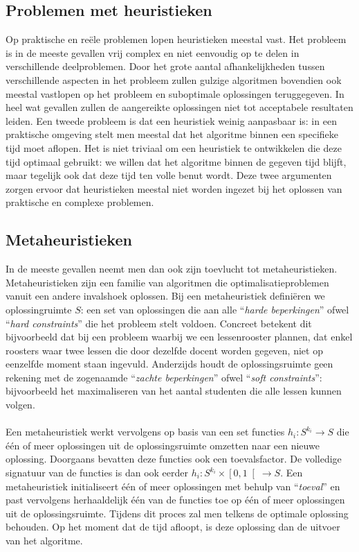 \subsection{Problemen met heuristieken}

Op praktische en re\"ele problemen lopen heuristieken meestal vast. Het probleem is in de meeste gevallen vrij complex en niet eenvoudig op te delen in verschillende deelproblemen. Door het grote aantal afhankelijkheden tussen verschillende aspecten in het probleem zullen gulzige algoritmen bovendien ook meestal vastlopen op het probleem en suboptimale oplossingen teruggegeven. In heel wat gevallen zullen de aangereikte oplossingen niet tot acceptabele resultaten leiden. Een tweede probleem is dat een heuristiek weinig aanpasbaar is: in een praktische omgeving stelt men meestal dat het algoritme binnen een specifieke tijd moet aflopen. Het is niet triviaal om een heuristiek te ontwikkelen die deze tijd optimaal gebruikt: we willen dat het algoritme binnen de gegeven tijd blijft, maar tegelijk ook dat deze tijd ten volle benut wordt. Deze twee argumenten zorgen ervoor dat heuristieken meestal niet worden ingezet bij het oplossen van praktische en complexe problemen.

\subsection{Metaheuristieken}

In de meeste gevallen neemt men dan ook zijn toevlucht tot metaheuristieken. Metaheuristieken zijn een familie van algoritmen die optimalisatieproblemen vanuit een andere invalshoek oplossen. Bij een metaheuristiek defini\"eren we oplossingruimte $S$: een set van oplossingen die aan alle ``\emph{harde beperkingen}'' ofwel ``\emph{hard constraints}'' die het probleem stelt voldoen. Concreet betekent dit bijvoorbeeld dat bij een probleem waarbij we een lessenrooster plannen, dat enkel roosters waar twee lessen die door dezelfde docent worden gegeven, niet op eenzelfde moment staan ingevuld. Anderzijds houdt de oplossingsruimte geen rekening met de zogenaamde ``\emph{zachte beperkingen}'' ofwel ``\emph{soft constraints}'': bijvoorbeeld het maximaliseren van het aantal studenten die alle lessen kunnen volgen.

\paragraph{}
Een metaheuristiek werkt vervolgens op basis van een set functies $h_i:S^{k_i}\rightarrow S$ die \'e\'en of meer oplossingen uit de oplossingsruimte omzetten naar een nieuwe oplossing. Doorgaans bevatten deze functies ook een toevalsfactor. De volledige signatuur van de functies is dan ook eerder $h_i:S^{k_i}\times\left[0,1\right[\rightarrow S$. Een metaheuristiek initialiseert \'e\'en of meer oplossingen met behulp van ``\emph{toeval}'' en past vervolgens herhaaldelijk \'e\'en van de functies toe op \'e\'en of meer oplossingen uit de oplossingsruimte. Tijdens dit proces zal men telkens de optimale oplossing behouden. Op het moment dat de tijd afloopt, is deze oplossing dan de uitvoer van het algoritme.

